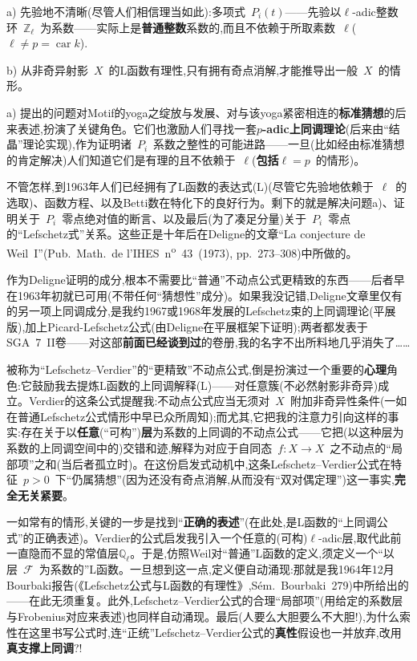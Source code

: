 a) 先验地不清晰(尽管人们相信理当如此):多项式~$P_i(t)$——先验以$\ell$-adic整数环~$\mathbb{Z}_\ell$~为系数——实际上是\textbf{普通整数}系数的,而且不依赖于所取素数~$\ell$($\ell\ne p=\operatorname{car}k$).

b) 从非奇异射影~$X$~的L函数有理性,只有拥有奇点消解,才能推导出一般~$X$~的情形。

a) 提出的问题对Motif的yoga之绽放与发展、对与该yoga紧密相连的\textbf{标准猜想}的后来表述,扮演了关键角色。它们也激励人们寻找一套\dmark{}\textbf{$p$-adic上同调理论}(后来由“结晶”理论实现),作为证明诸~$P_i$~系数之整性的可能进路——一旦(比如经由标准猜想的肯定解决)人们知道它们是有理的且不依赖于~$\ell$(\textbf{包括}$\ell=p$~的情形)。

不管怎样,到1963年人们已经拥有了L函数的表达式(L)(尽管它先验地依赖于~$\ell$~的选取)、函数方程、以及Betti数在特化下的良好行为。剩下的就是解决问题a)、证明关于~$P_i$~零点绝对值的断言、以及最后(为了凑足分量)关于~$P_i$~零点的“Lefschetz式”关系。这些正是十年后在Deligne的文章“La conjecture de Weil~I”(Pub.~Math.~de l'IHES~n\textsuperscript{o}~43~(1973), pp.~273--308)中所做的。

作为Deligne证明的成分,根本不需要比“普通”不动点公式更精致的东西——后者早在1963年初就已可用(不带任何“猜想性”成分)。如果我没记错,Deligne文章里仅有的另一项上同调成分,是我约1967或1968年发展的Lefschetz束的上同调理论(平展版),加上Picard-Lefschetz公式(由Deligne在平展框架下证明);两者都发表于SGA~7~II卷——对这部\textbf{前面已经谈到过}的卷册,我的名字不出所料地几乎消失了……

被称为“Lefschetz--Verdier”的“更精致”不动点公式,倒是扮演过一个重要的\textbf{心理}角色:它鼓励我去提炼L函数的上同调解释(L)——对任意簇(不必然射影非奇异)成立。Verdier的这条公式提醒我:不动点公式应当无须对~$X$~附加非奇异性条件(一如在普通Lefschetz公式情形中早已众所周知);而尤其,它把我的注意力引向这样的事实:存在关于以\textbf{任意}(“可构”)\textbf{层}为系数的上同调的不动点公式——它把(以这种层为系数的上同调空间中的)交错和迹,解释为对应于自同态~$f:X\to X$~之不动点的“局部项”之和(当后者孤立时)。在这份启发式动机中,这条Lefschetz--Verdier公式在特征~$p>0$~下“仍属猜想”(因为还没有奇点消解,\dmark{}从而没有“双对偶定理”)这一事实,\textbf{完全无关紧要}。

一如常有的情形,关键的一步是找到“\textbf{正确的表述}”(在此处,是L函数的“上同调公式”的正确表述)。Verdier的公式启发我引入一个任意的(可构)$\ell$-adic层,取代此前一直隐而不显的常值层$\mathbb{Q}_\ell$。于是,仿照Weil对“普通”L函数的定义,须定义一个“以层~$\mathcal{F}$~为系数的”L函数。一旦想到这一点,定义便自动涌现:那就是我1964年12月Bourbaki报告(《Lefschetz公式与L函数的有理性》,Sém.~Bourbaki~279)中所给出的——在此无须重复。此外,Lefschetz--Verdier公式的合理“局部项”(用给定的系数层与Frobenius对应来表述)也同样自动涌现。最后(人要么大胆要么不大胆!),为什么索性在这里书写公式时,连“正统”Lefschetz--Verdier公式的\textbf{真性}假设也一并放弃,改用\textbf{真支撑上同调}?!

